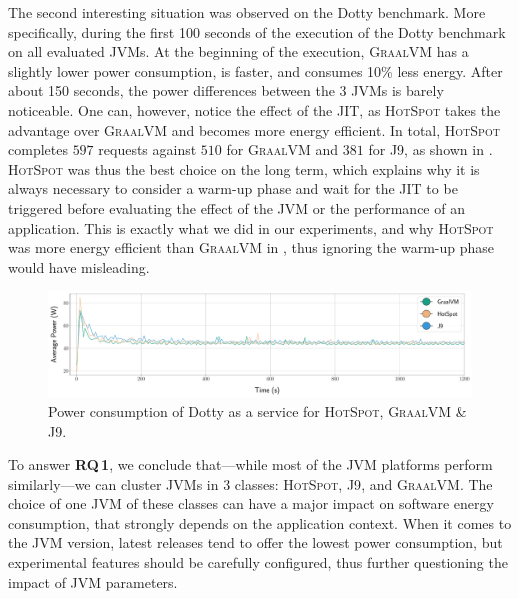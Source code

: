 The second interesting situation was observed on the \textsf{Dotty} benchmark.
More specifically, during the first 100 seconds of the execution of the \textsf{Dotty} benchmark on all evaluated JVMs.
At the beginning of the execution, \textsc{GraalVM} has a slightly lower power consumption, is faster, and consumes 10\% less energy.
After about 150 seconds, the power differences between the 3 JVMs is barely noticeable.
One can, however, notice the effect of the JIT, as \textsc{HotSpot} takes the advantage over \textsc{GraalVM} and becomes more energy efficient.
In total, \textsc{HotSpot} completes $597$ requests against $510$ for \textsc{GraalVM} and $381$ for \textsc{J9}, as shown in .
\textsc{HotSpot} was thus the best choice on the long term, which explains why it is always necessary to consider a warm-up phase and wait for the JIT to be triggered before evaluating the effect of the JVM or the performance of an application.
This is exactly what we did in our experiments, and why \textsc{HotSpot} was more energy efficient than \textsc{GraalVM} in , thus ignoring the warm-up phase would have misleading.

\begin{figure}%
    \includegraphics[width=.9\linewidth]{imgs/powers_chetemi-2-dotty.pdf}
    \centering
    \captionsetup{justification=centering}
    \caption{Power consumption of \textsf{Dotty} as a service for \textsc{HotSpot}, \textsc{GraalVM} \& \textsc{J9}.}
    \label{fig:servicedotty}
\end{figure}
\begin{mdframed}[]
    To answer \textbf{RQ\,1}, we conclude that---while most of the JVM platforms perform similarly---we can cluster JVMs in 3 classes: \textsc{HotSpot}, \textsc{J9}, and \textsc{GraalVM}.
    The choice of one JVM of these classes can have a major impact on software energy consumption, that strongly depends on the application context.
    When it comes to the JVM version, latest releases tend to offer the lowest power consumption, but experimental features should be carefully configured, thus further questioning the impact of JVM parameters.
\end{mdframed}

